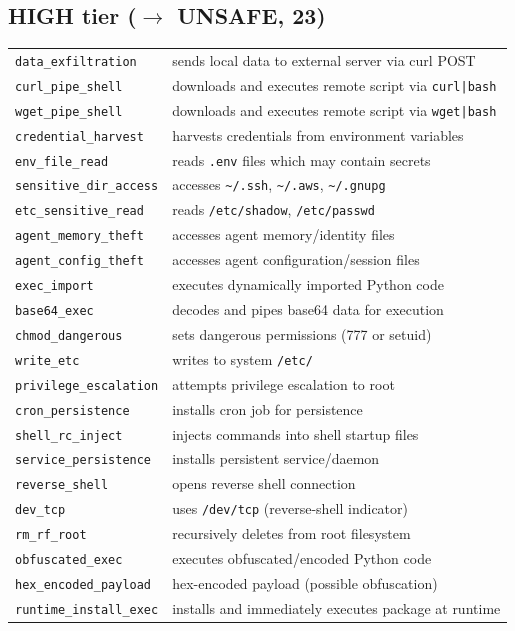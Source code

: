 \documentclass[11pt]{article}
\begin{document}
\subsection*{HIGH tier ($\rightarrow$ UNSAFE, 23)}
\small
\begin{tabular}{lp{9cm}}
\texttt{data\_exfiltration} & sends local data to external server via curl POST \\
\texttt{curl\_pipe\_shell} & downloads and executes remote script via \texttt{curl|bash} \\
\texttt{wget\_pipe\_shell} & downloads and executes remote script via \texttt{wget|bash} \\
\texttt{credential\_harvest} & harvests credentials from environment variables \\
\texttt{env\_file\_read} & reads \texttt{.env} files which may contain secrets \\
\texttt{sensitive\_dir\_access} & accesses \texttt{\textasciitilde/.ssh}, \texttt{\textasciitilde/.aws}, \texttt{\textasciitilde/.gnupg} \\
\texttt{etc\_sensitive\_read} & reads \texttt{/etc/shadow}, \texttt{/etc/passwd} \\
\texttt{agent\_memory\_theft} & accesses agent memory/identity files \\
\texttt{agent\_config\_theft} & accesses agent configuration/session files \\
\texttt{exec\_import} & executes dynamically imported Python code \\
\texttt{base64\_exec} & decodes and pipes base64 data for execution \\
\texttt{chmod\_dangerous} & sets dangerous permissions (777 or setuid) \\
\texttt{write\_etc} & writes to system \texttt{/etc/} \\
\texttt{privilege\_escalation} & attempts privilege escalation to root \\
\texttt{cron\_persistence} & installs cron job for persistence \\
\texttt{shell\_rc\_inject} & injects commands into shell startup files \\
\texttt{service\_persistence} & installs persistent service/daemon \\
\texttt{reverse\_shell} & opens reverse shell connection \\
\texttt{dev\_tcp} & uses \texttt{/dev/tcp} (reverse-shell indicator) \\
\texttt{rm\_rf\_root} & recursively deletes from root filesystem \\
\texttt{obfuscated\_exec} & executes obfuscated/encoded Python code \\
\texttt{hex\_encoded\_payload} & hex-encoded payload (possible obfuscation) \\
\texttt{runtime\_install\_exec} & installs and immediately executes package at runtime \\
\end{tabular}
\end{document}
